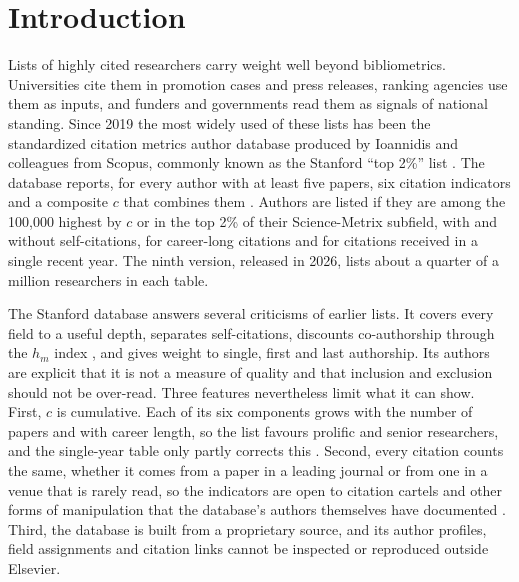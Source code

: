 \section{Introduction}
\label{sec:introduction}

Lists of highly cited researchers carry weight well beyond bibliometrics. Universities cite them in promotion cases and press releases, ranking agencies use them as inputs, and funders and governments read them as signals of national standing. Since 2019 the most widely used of these lists has been the standardized citation metrics author database produced by Ioannidis and colleagues from Scopus, commonly known as the Stanford ``top 2\%'' list \citep{ioannidisStandardizedCitationMetrics2019a, ioannidisUpdatedSciencewideAuthor2020}. The database reports, for every author with at least five papers, six citation indicators and a composite $c$ that combines them \citep{ioannidisMultipleCitationIndicators2016}. Authors are listed if they are among the 100,000 highest by $c$ or in the top 2\% of their Science-Metrix subfield, with and without self-citations, for career-long citations and for citations received in a single recent year. The ninth version, released in 2026, lists about a quarter of a million researchers in each table.

The Stanford database answers several criticisms of earlier lists. It covers every field to a useful depth, separates self-citations, discounts co-authorship through the $h_m$ index \citep{schreiberCaseStudyArbitrariness2013}, and gives weight to single, first and last authorship. Its authors are explicit that it is not a measure of quality and that inclusion and exclusion should not be over-read. Three features nevertheless limit what it can show. First, $c$ is cumulative. Each of its six components grows with the number of papers and with career length, so the list favours prolific and senior researchers, and the single-year table only partly corrects this \citep{ioannidisStandardizedCitationMetrics2019a}. Second, every citation counts the same, whether it comes from a paper in a leading journal or from one in a venue that is rarely read, so the indicators are open to citation cartels and other forms of manipulation that the database's authors themselves have documented \citep{ioannidisGeneralizedViewSelfcitation2015, szomszorHowMuchToo2020}. Third, the database is built from a proprietary source, and its author profiles, field assignments and citation links cannot be inspected or reproduced outside Elsevier.

